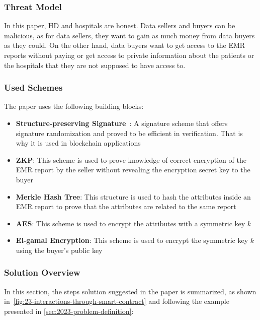 \subsubsection{Threat Model}
In this paper, HD and hospitals are honest.
Data sellers and buyers can be malicious, as for data sellers, they want to gain as much money from data buyers as they could.
On the other hand, data buyers want to get access to the EMR reports without paying or get access to private information about the patients or the hospitals that they are not supposed to have access to.

\subsubsection{Used Schemes}
The paper uses the following building blocks:

\begin{itemize}
    \item \textbf{Structure-preserving Signature}~\cite{gay2018more}: A signature scheme that offers signature randomization and proved to be efficient in verification. That is why it is used in blockchain applications
    \item \textbf{ZKP}: This scheme is used to prove knowledge of correct encryption of the EMR report by the seller without revealing the encryption secret key to the buyer
    \item \textbf{Merkle Hash Tree}: This structure is used to hash the attributes inside an EMR report to prove that the attributes are related to the same report
    \item \textbf{AES}: This scheme is used to encrypt the attributes with a symmetric key $k$
    \item \textbf{El-gamal Encryption}: This scheme is used to encrypt the symmetric key $k$ using the buyer's public key
\end{itemize}

\subsubsection{Solution Overview}

In this section, the steps solution suggested in the paper is summarized, as shown in~\cref{fig:23-interactions-through-smart-contract} and following the example presented in \cref{sec:2023-problem-definition}:

